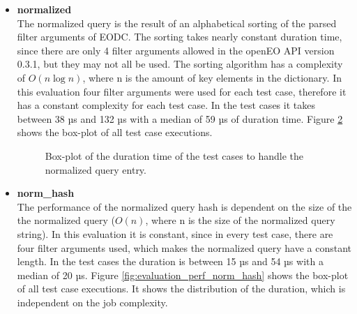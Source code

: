 \documentclass[draft,final]{vutinfth} %
\begin{document}
\begin{itemize}
\begin{figure}[!h]
		\label{fig:evaluation_perf_original}
	\end{figure}
	\item \textbf{normalized} \\
	The normalized query is the result of an alphabetical sorting of the parsed filter arguments of EODC. The sorting takes nearly constant duration time, since there are only 4 filter arguments allowed in the openEO API version 0.3.1, but they may not all be used. The sorting algorithm has a complexity of $O(n\log{}n)$, where n is the amount of key elements in the dictionary. In this evaluation four filter arguments were used for each test case, therefore it has a constant complexity for each test case. In the test cases it takes between 38 µs and 132 µs with a median of 59 µs of duration time. Figure \ref{fig:evaluation_perf_normalized} shows the box-plot of all test case executions.  
	\begin{figure}[!h]
		\centering
		\caption{Box-plot of the duration time of the test cases to handle the normalized query entry.}
		\label{fig:evaluation_perf_normalized}
	\end{figure}
	\item \textbf{norm\_hash} \\
	The performance of the normalized query hash is dependent on the size of the the normalized query ($O(n)$, where n is the size of the normalized query string). In this evaluation it is constant, since in every test case, there are four filter arguments used, which makes the normalized query have a constant length. In the test cases the duration is between 15 µs and 54 µs with a median of 20 µs. Figure \ref{fig:evaluation_perf_norm_hash} shows the box-plot of all test case executions. It shows the distribution of the duration, which is independent on the job complexity. 

\end{itemize}
\end{document}
